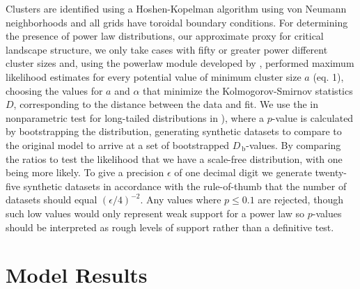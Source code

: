 \documentclass[10pt]{article}
\begin{document}
\begin{linenumbers}
Clusters are identified using a Hoshen-Kopelman algorithm using von Neumann neighborhoods and all grids have toroidal boundary conditions. For determining the presence of power law distributions, our approximate proxy for critical landscape structure, we only take cases with fifty or greater power different cluster sizes and, using the powerlaw module developed by \citet{Alstott2014}, performed maximum likelihood estimates for every potential value of minimum cluster size $a$ (eq. 1), choosing the values for $a$ and $\alpha$ that minimize the Kolmogorov-Smirnov statistics $D$, corresponding to the distance between the data and fit. We use the  in nonparametric test for long-tailed distributions in \citealt{Vuong,Clauset2009,Virkar2014}), where a $p$-value is calculated by bootstrapping the distribution, generating synthetic datasets to compare to the original model to arrive at a set of bootstrapped $D_{\,\mathrm{b}}$-values. By comparing the ratios to test the likelihood that we have a scale-free distribution, with one being more likely. To give a precision $\epsilon$ of one decimal digit we generate twenty-five synthetic datasets in accordance with the rule-of-thumb that the number of datasets should equal $(\epsilon/4)^{-2}$. Any values where $p \le 0.1$ are rejected, though such low values would only represent weak support for a power law so $p$-values should be interpreted as rough levels of support rather than a definitive test.


\section{Model Results}


\end{linenumbers}
\end{document}
